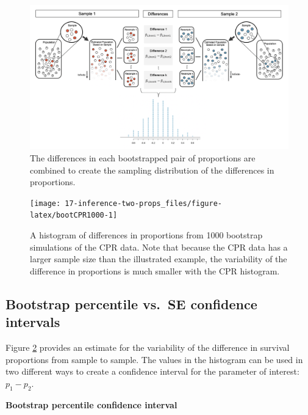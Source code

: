 \documentclass[
  10pt,
  openany]{book}
\begin{document}
\begin{figure}[h]

{\centering \includegraphics[width=1\linewidth]{images/boot2prop1} 

}

\caption{The differences in each bootstrapped pair of proportions are combined to create the sampling distribution of the differences in proportions.}\label{fig:boot2samp1}
\end{figure}

\begin{figure}[h]

{\centering \texttt{[image: 17-inference-two-props\_files/figure-latex/bootCPR1000-1]} 

}

\caption{A histogram of differences in proportions from 1000 bootstrap simulations of the CPR data.  Note that because the CPR data has a larger sample size than the illustrated example, the variability of the difference in proportions is much smaller with the CPR histogram.}\label{fig:bootCPR1000}
\end{figure}

\hypertarget{bootstrap-percentile-vs.-se-confidence-intervals}{%
\subsection{Bootstrap percentile vs.~SE confidence intervals}\label{bootstrap-percentile-vs.-se-confidence-intervals}}

Figure \ref{fig:bootCPR1000} provides an estimate for the variability of the difference in survival proportions from sample to sample.
The values in the histogram can be used in two different ways to create a confidence interval for the parameter of interest: \(p_1 - p_2.\)

\textbf{Bootstrap percentile confidence interval}
\end{document}
